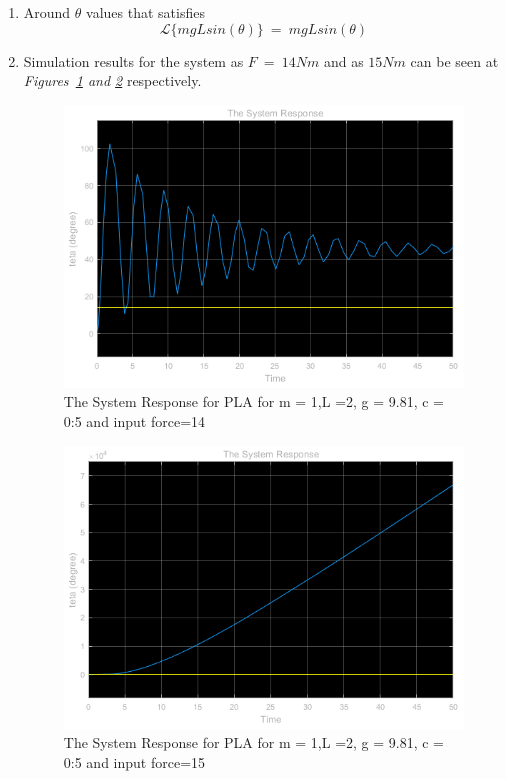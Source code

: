 \documentclass[a4paper,12pt]{article}
\begin{document}
\begin{enumerate}
\begin{enumerate}
			\item Around $\theta$ values that satisfies
				$$	\mathcal{L}\{mgLsin(\theta)\}~=~mgLsin(\theta)	$$	
			\item Simulation results for the system as $F~=~14Nm$ and as $15Nm$ can be seen at \textit{Figures~\ref{fig:2d2} and \ref{fig:2d1}} respectively.
			
			
				\begin{figure}[H]
					\center
					\setlength{\unitlength}{\textwidth} 
					\includegraphics[width=0.8\unitlength]{images/2d2}
					\caption{\label{fig:2d2} The System Response for PLA for m = 1,L =2, g = 9.81, c = 0:5 and input force=14}
				\end{figure}
				
				\begin{figure}[H]
					\center
					\setlength{\unitlength}{\textwidth} 
					\includegraphics[width=0.8\unitlength]{images/2d1}
					\caption{\label{fig:2d1} The System Response for PLA for m = 1,L =2, g = 9.81, c = 0:5 and input force=15 
 }
				\end{figure}
							



		\end{enumerate}
		
		
		
		
		
		
\end{enumerate}
	
	
	
	
\end{document}
